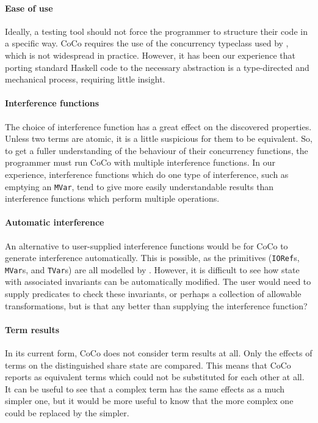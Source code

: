 \paragraph{Ease of use}
Ideally, a testing tool should not force the programmer to structure
their code in a specific way.  CoCo requires the use of the
concurrency typeclass used by \dejafu{}, which is not widespread in
practice.  However, it has been our experience that porting standard
Haskell code to the necessary abstraction is a type-directed and
mechanical process, requiring little insight.

\paragraph{Interference functions}
The choice of interference function has a great effect on the
discovered properties.  Unless two terms are atomic, it is a little
suspicious for them to be equivalent.  So, to get a fuller
understanding of the behaviour of their concurrency functions, the
programmer must run CoCo with multiple interference functions.  In our
experience, interference functions which do one type of interference,
such as emptying an \verb|MVar|, tend to give more easily
understandable results than interference functions which perform
multiple operations.

\paragraph{Automatic interference}
An alternative to user-supplied interference functions would be for
CoCo to generate interference automatically.  This is possible, as the
primitives (\verb|IORef|s, \verb|MVar|s, and \verb|TVar|s) are all
modelled by \dejafu{}.  However, it is difficult to see how state with
associated invariants can be automatically modified.  The user would
need to supply predicates to check these invariants, or perhaps a
collection of allowable transformations, but is that any better than
supplying the interference function?

\paragraph{Term results}
In its current form, CoCo does not consider term results at all.  Only
the effects of terms on the distinguished share state are compared.
This means that CoCo reports as equivalent terms which could not be
substituted for each other at all.  It can be useful to see that a
complex term has the same effects as a much simpler one, but it would
be more useful to know that the more complex one could be replaced by
the simpler.

